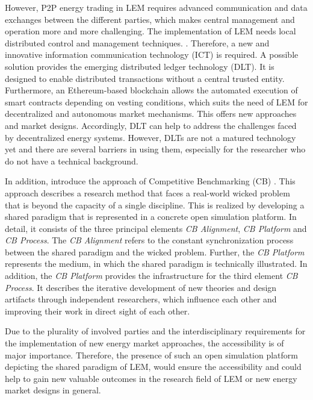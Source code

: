 However, P2P energy trading in LEM requires advanced communication and data exchanges between the different parties, 
which makes central management and operation more and more challenging. The implementation of LEM needs local 
distributed control and management techniques. . 
Therefore, a new and innovative information communication technology (ICT) is required.  
A possible solution provides the emerging distributed ledger technology (DLT). 
It is designed to enable distributed transactions without a central trusted entity. 
Furthermore, an Ethereum-based blockchain allows the automated execution of smart contracts depending 
on vesting conditions, which suits the need of LEM for decentralized and autonomous market mechanisms. 
This offers new approaches and market designs. Accordingly, DLT can help to address the challenges 
faced by decentralized energy systems. However, DLTs are not a matured technology yet and 
there are several barriers in using them, especially for the researcher who do not have a technical background. 

In addition,  introduce the approach of Competitive Benchmarking (CB) . 
This approach describes a research method that faces a real-world wicked problem that is beyond the capacity of a single discipline. 
This is realized by developing a shared paradigm that is represented in a concrete open simulation platform. 
In detail, it consists of the three principal elements \textit{CB Alignment}, \textit{CB Platform} and \textit{CB Process}. 
The \textit{CB Alignment} refers to the constant synchronization process between the shared paradigm and the wicked problem. 
Further, the \textit{CB Platform} represents the medium, in which the shared paradigm is technically illustrated. 
In addition, the \textit{CB Platform} provides the infrastructure for the third element \textit{CB Process}. 
It describes the iterative development of new theories and design artifacts through independent researchers, 
which influence each other and improving their work in direct sight of each other. 

Due to the plurality of involved parties and the interdisciplinary requirements for the 
implementation of new energy market approaches, the accessibility is of major importance.
Therefore, the presence of such an open simulation platform depicting the shared paradigm of LEM, 
would ensure the accessibility and could help to gain new valuable outcomes in the research field 
of LEM or new energy market designs in general. 

